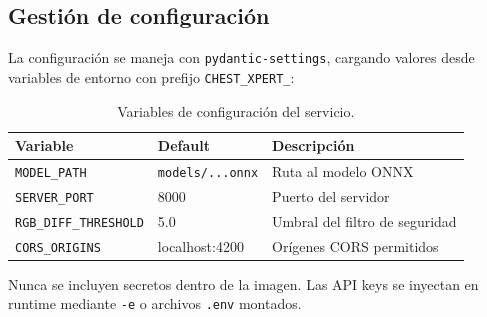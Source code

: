 \subsection{Gesti\'on de configuraci\'on}

La configuraci\'on se maneja con \texttt{pydantic-settings}, cargando valores desde variables de entorno con prefijo \texttt{CHEST\_XPERT\_}:

\begin{table}[H]
\centering
\caption{Variables de configuraci\'on del servicio.}
\small
\begin{tabular}{llp{5cm}}
\toprule
\textbf{Variable} & \textbf{Default} & \textbf{Descripci\'on} \\
\midrule
\texttt{MODEL\_PATH} & \texttt{models/...onnx} & Ruta al modelo ONNX \\
\texttt{SERVER\_PORT} & 8000 & Puerto del servidor \\
\texttt{RGB\_DIFF\_THRESHOLD} & 5.0 & Umbral del filtro de seguridad \\
\texttt{CORS\_ORIGINS} & localhost:4200 & Or\'igenes CORS permitidos \\
\bottomrule
\end{tabular}
\end{table}

Nunca se incluyen secretos dentro de la imagen. Las API keys se inyectan en runtime mediante \texttt{-e} o archivos \texttt{.env} montados.
